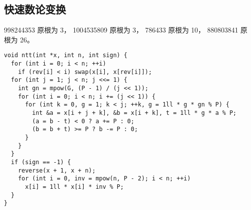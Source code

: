 \subsection{快速数论变换}
998244353 原根为 3，
1004535809 原根为 3，
786433 原根为 10，
880803841 原根为 26。
\begin{lstlisting}
void ntt(int *x, int n, int sign) {
  for (int i = 0; i < n; ++i)
    if (rev[i] < i) swap(x[i], x[rev[i]]);
  for (int j = 1; j < n; j <<= 1) {
    int gn = mpow(G, (P - 1) / (j << 1));
    for (int i = 0; i < n; i += (j << 1)) {
      for (int k = 0, g = 1; k < j; ++k, g = 1ll * g * gn % P) {
        int &a = x[i + j + k], &b = x[i + k], t = 1ll * g * a % P;
        (a = b - t) < 0 ? a += P : 0;
        (b = b + t) >= P ? b -= P : 0;
      }
    }
  }
  if (sign == -1) {
    reverse(x + 1, x + n);
    for (int i = 0, inv = mpow(n, P - 2); i < n; ++i)
      x[i] = 1ll * x[i] * inv % P;
  }
}
\end{lstlisting}